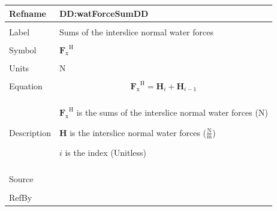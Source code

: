 \documentclass[12pt]{article}
\begin{document}
\noindent \begin{minipage}{\textwidth}
\begin{tabular}{>{\raggedright}p{}>{\raggedright\arraybackslash}p{}}
\toprule \textbf{Refname} & \textbf{DD:watForceSumDD}
\label{DD:watForceSumDD}
\\ \midrule \\
Label & Sums of the interslice normal water forces
\\ \midrule \\
Symbol & ${{\mathbf{F}_{\text{x}}}^{\text{H}}}$
\\ \midrule \\
Units & N
\\ \midrule \\
Equation & \begin{displaymath}
           {{\mathbf{F}_{\text{x}}}^{\text{H}}}={\mathbf{H}}_{i}+{\mathbf{H}}_{i-1}
           \end{displaymath}
\\ \midrule \\
Description & \begin{symbDescription}
              \item{${{\mathbf{F}_{\text{x}}}^{\text{H}}}$ is the sums of the interslice normal water forces (N)}
              \item{$\mathbf{H}$ is the interslice normal water forces ($\frac{\text{N}}{\text{m}}$)}
              \item{$i$ is the index (Unitless)}
              \end{symbDescription}
\\ \midrule \\
Source & \cite{fredlund1977}
\\ \midrule \\
RefBy & 
\\ \bottomrule
\end{tabular}
\end{minipage}
\par~
\end{document}
